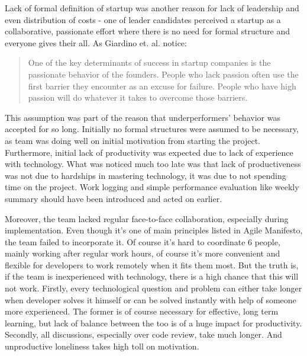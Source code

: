\documentclass{article}
\begin{document}
Lack of formal definition of startup \cite{paternoster2014software} was another reason for lack of leadership and even distribution of costs - one of leader candidates perceived a startup as a collaborative, passionate effort where there is no need for formal structure and everyone gives their all. As Giardino et. al. \cite{giardino2014early} notice:
\begin{quote}
  One of the key determinants of success in startup companies is the passionate behavior of the founders. People who lack passion often use the first barrier they encounter as an excuse for failure. People who have high passion will do whatever it takes to overcome those barriers.
\end{quote}

This assumption was part of the reason that underperformers' behavior was accepted for so long. Initially no formal structures were assumed to be necessary, as team was doing well on initial motivation from starting the project. Furthermore, initial lack of productivity was expected due to lack of experience with technology. What was noticed much too late was that lack of productiveness was not due to hardships in mastering technology, it was due to not spending time on the project. Work logging and simple performance evaluation like weekly summary should have been introduced and acted on earlier.

Moreover, the team lacked regular face-to-face collaboration, especially during implementation. Even though it's one of main principles listed in Agile Manifesto, the team failed to incorporate it. Of course it's hard to coordinate 6 people, mainly working after regular work hours, of course it's more convenient and flexible for developers to work remotely when it fits them most. But the truth is, if the team is inexperienced with technology, there is a high chance that this will not work. Firstly, every technological question and problem can either take longer when developer solves it himself or can be solved instantly with help of someone more experienced. The former is of course necessary for effective, long term learning, but lack of balance between the too is of a huge impact for productivity. Secondly, all discussions, especially over code review, take much longer. And unproductive loneliness takes high toll on motivation.
\end{document}
